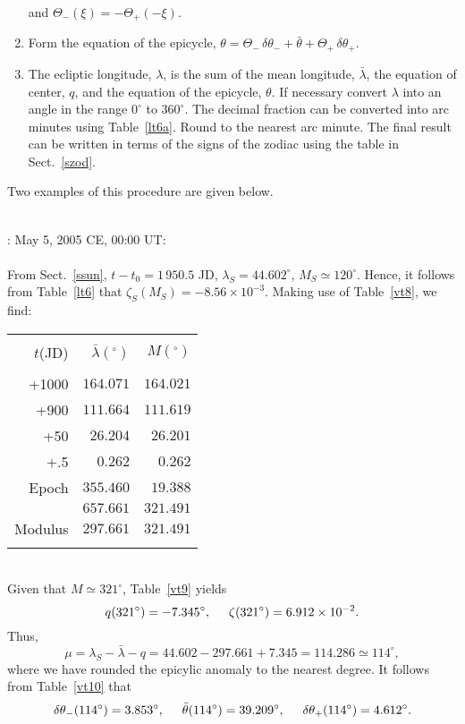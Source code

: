 \begin{enumerate}
and $\Theta_-(\xi)=-\Theta_+(-\xi)$. 
\item Form the equation of the epicycle, $\theta = \Theta_-\,\delta\theta_-+ \bar{\theta}
+ \Theta_+\,\delta\theta_+$.
\item The ecliptic longitude, $\lambda$, is the sum of the mean longitude, $\bar{\lambda}$,  the equation of center, $q$, and the equation
of the epicycle, $\theta$. If necessary convert $\lambda$
into  an angle in the range $0^\circ$ to $360^\circ$. The decimal fraction can
be converted into arc minutes
using Table~\ref{lt6a}. Round to the nearest arc minute. The final result
can be written in terms of the signs of the zodiac using the table in Sect.~\ref{szod}.
\end{enumerate}
Two examples of this procedure are given below.

~\\
: May 5, 2005 CE, 00:00 UT:\\
~\\
From Sect.~\ref{ssun}, $t-t_0=1\,950.5$ JD, $\lambda_S= 44.602^\circ$, $M_S\simeq 120^\circ$. Hence, it follows from Table~\ref{lt6} that
$\zeta_S(M_S)= -8.56\times 10^{-3}$. Making use of
Table~\ref{vt8}, we find:\\
\begin{tabular}{rrr}
&&\\
$t$(JD) & $ \bar{\lambda}(^\circ)$ & $M(^\circ)$\\[-2ex]
&&\\
+1000 & $164.071$ & $164.021$\\
+900 & $111.664$ & $111.619$\\
+50 & $26.204$ & $26.201$\\
+.5 & $0.262$ & $0.262$\\
Epoch & $355.460$ & $19.388$\\\cline{2-3}
&$657.661$ & $321.491$\\\cline{2-3}
Modulus & $297.661$ & $321.491$\\ 
&&\\
\end{tabular}\\
Given that $M\simeq 321^\circ$, Table~\ref{vt9} yields 
$$
q(321^\circ)= -7.345^\circ,\mbox{\hspace{0.5cm}}\zeta(321^\circ)=6.912\times 10^{-2}.
$$
Thus, 
$$
\mu=\lambda_S - \bar{\lambda}-q = 44.602-297.661 + 7.345= 114.286\simeq
114^\circ,
$$
where we have rounded the epicylic anomaly to the nearest degree. It follows from Table~\ref{vt10}
that 
$$
\delta\theta_-(114^\circ) = 3.853^\circ,\mbox{\hspace{0.5cm}}\bar{\theta}(114^\circ)=39.209^\circ, \mbox{\hspace{0.5cm}}\delta\theta_+(114^\circ) = 4.612^\circ.
$$
